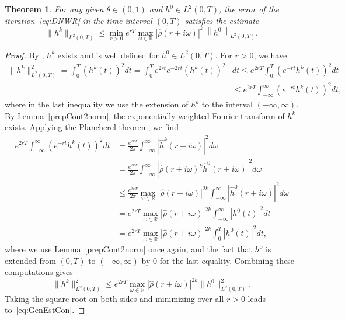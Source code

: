 \documentclass[10pt,a4paper]{amsart}
\newtheorem{theorem}{Theorem}
\newcommand{\norm}[1]{\left\lVert#1\right\rVert}
\begin{document}
\begin{theorem}\label{2normSuperCont}
	For any given $\theta\in (0, 1)$ and $h^0\in L^2(0, T)$, the error of the iteration~\eqref{eq:DNWR} in the time interval $(0, T)$ satisfies the estimate 
	\begin{equation}\label{eq:GenEstCon}
	\|h^k\|_{L^2(0, T)} \leq \min_{r > 0} e^{rT}\max_{\omega \in \mathbb{R}} \left|\hat{\rho}(r + i \omega)\right|^k \, \norm{h^0}_{L^2(0, T)}.
	\end{equation}
\end{theorem} 

\begin{proof}
	By \cite[Chapter 4]{Lions72}, $h^k$ exists and is well defined for $h^0 \in L^2(0,T)$. For $r > 0$, we have
	\[\begin{aligned}
		\|h^k\|_{L^2(0, T)}^2 = \int_{0}^{T} \left(h^{k}(t)\right)^2 dt = \int_{0}^{T} e^{2rt} e^{-2 r t} \left(h^{k}(t)\right)^2 &dt \leq e^{2rT} \int_{0}^{T} \left(e^{-r t}h^{k}(t)\right)^2 dt \\
		&\leq e^{2rT} \int_{-\infty}^{\infty} \left( e^{- r t} h^{k}(t)\right)^2 dt,
	\end{aligned}\]
	where in the last inequality we use the  extension of $h^k$ to the interval $(-\infty,\infty)$. By Lemma~\ref{prepCont2norm}, the exponentially weighted Fourier transform of $h^k$ exists. Applying the Plancherel theorem, we find
	\[\begin{aligned}
		e^{2rT} \int_{-\infty}^{\infty} \left( e^{- r t}h^{k}(t)\right)^2 dt 
		&= \frac{e^{2rT}}{2 \pi} \int_{-\infty}^{\infty} \left| \hat{h}^{k}(r + i \omega) \right|^2 d\omega \\
		&= \frac{e^{2rT}}{2 \pi} \int_{-\infty}^{\infty} \left| \hat{\rho}(r + i \omega)^k \hat{h}^0(r + i \omega) \right|^2 d\omega \\
		&\leq \frac{e^{2rT}}{2 \pi} \max_{\omega \in \mathbb{R}} \left|\hat{\rho}(r  + i\omega)\right|^{2k} \int_{-\infty}^{\infty} \left| \hat{h}^{0}(r + i \omega) \right|^2 d\omega \\
		&= e^{2rT} \max_{\omega \in \mathbb{R}} \left|\hat{\rho}(r + i\omega)\right|^{2k}\int_{-\infty}^{\infty} \left| h^{0}(t) \right|^2 dt \\
		&= e^{2rT} \max_{\omega \in \mathbb{R}} \left|\hat{\rho}(r + i\omega)\right|^{2k}\int_{0}^{T} \left| h^{0}(t) \right|^2 dt,
	\end{aligned}\]
	where we use Lemma~\ref{prepCont2norm} once again, and the fact that $h^0$ is extended from $(0, T)$ to $(-\infty, \infty)$ by 0 for the last equality. Combining these computations gives 
	\[\|h^k\|_{L^2(0, T)}^2 \leq e^{2rT} \max_{\omega \in \mathbb{R}} |\hat{\rho}(r + i\omega)|^{2k} \|h^0\|_{L^2(0, T)}^2.\]
	Taking the square root on both sides and minimizing over all $r>0$ leads to~\eqref{eq:GenEstCon}.
\end{proof}
\end{document}
